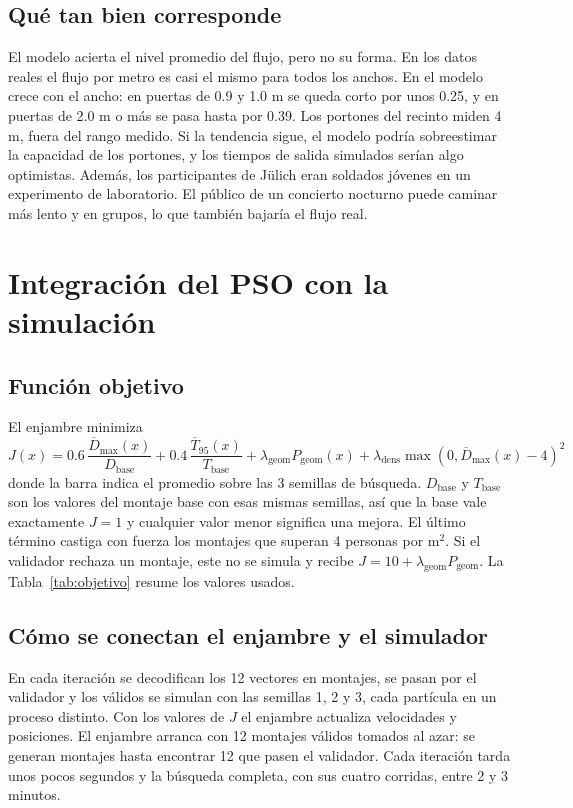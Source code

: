 \documentclass[11pt,letterpaper]{article}
\begin{document}
\subsection{Qué tan bien corresponde}
El modelo acierta el nivel promedio del flujo, pero no su forma. En los datos reales el flujo por metro es casi el mismo para todos los anchos. En el modelo crece con el ancho: en puertas de 0.9 y 1.0 m se queda corto por unos 0.25, y en puertas de 2.0 m o más se pasa hasta por 0.39. Los portones del recinto miden 4 m, fuera del rango medido. Si la tendencia sigue, el modelo podría sobreestimar la capacidad de los portones, y los tiempos de salida simulados serían algo optimistas. Además, los participantes de Jülich eran soldados jóvenes en un experimento de laboratorio. El público de un concierto nocturno puede caminar más lento y en grupos, lo que también bajaría el flujo real.

\section{Integración del PSO con la simulación}

\subsection{Función objetivo}
El enjambre minimiza
\begin{equation}
J(x) = 0.6\,\frac{\overline{D}_{\max}(x)}{D_{\text{base}}} + 0.4\,\frac{\overline{T}_{95}(x)}{T_{\text{base}}} + \lambda_{\text{geom}} P_{\text{geom}}(x) + \lambda_{\text{dens}} \max\left(0, \overline{D}_{\max}(x) - 4\right)^2
\end{equation}
donde la barra indica el promedio sobre las 3 semillas de búsqueda. $D_{\text{base}}$ y $T_{\text{base}}$ son los valores del montaje base con esas mismas semillas, así que la base vale exactamente $J = 1$ y cualquier valor menor significa una mejora. El último término castiga con fuerza los montajes que superan 4 personas por m$^2$. Si el validador rechaza un montaje, este no se simula y recibe $J = 10 + \lambda_{\text{geom}} P_{\text{geom}}$. La Tabla~\ref{tab:objetivo} resume los valores usados.

\begin{table}[H]
\centering
\caption{Elementos de la función objetivo y de la búsqueda.}
\label{tab:objetivo}

\end{table}

\subsection{Cómo se conectan el enjambre y el simulador}
En cada iteración se decodifican los 12 vectores en montajes, se pasan por el validador y los válidos se simulan con las semillas 1, 2 y 3, cada partícula en un proceso distinto. Con los valores de $J$ el enjambre actualiza velocidades y posiciones. El enjambre arranca con 12 montajes válidos tomados al azar: se generan montajes hasta encontrar 12 que pasen el validador. Cada iteración tarda unos pocos segundos y la búsqueda completa, con sus cuatro corridas, entre 2 y 3 minutos.
\end{document}
